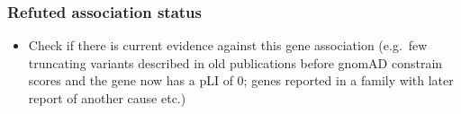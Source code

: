 \documentclass[
]{article}
\providecommand{\tightlist}{%
  \setlength{\itemsep}{0pt}\setlength{\parskip}{0pt}}
\begin{document}
\hypertarget{refuted-association-status}{%
\subsubsection{Refuted association status}\label{refuted-association-status}}

\begin{itemize}
\tightlist
\item
  Check if there is current evidence against this gene association (e.g.~few truncating variants described in old publications before gnomAD constrain scores and the gene now has a pLI of 0; genes reported in a family with later report of another cause etc.)
\end{itemize}

  
\end{document}
